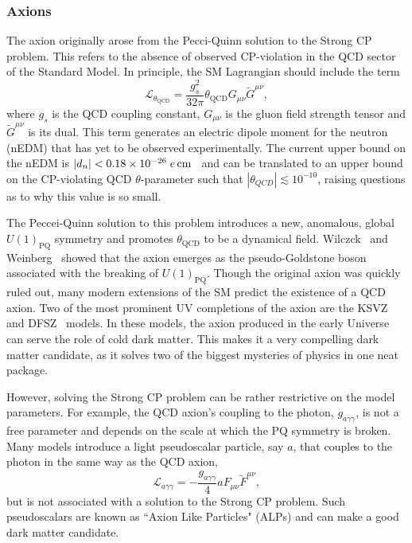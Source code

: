 \subsubsection{Axions}
The axion originally arose from the Pecci-Quinn solution to the Strong CP problem. This refers to the absence of observed CP-violation in the QCD sector of the Standard Model. In principle, the SM Lagrangian should include the term
\begin{equation}
    \mathcal{L}_{\theta_\mathrm{QCD}} = \frac{g_s^2}{32 \pi}\theta_\mathrm{QCD} G_{\mu\nu} \tilde{G}^{\mu\nu},
\end{equation}
where $g_s$ is the QCD coupling constant, $G_{\mu\nu}$ is the gluon field strength tensor and $\tilde{G}^{\mu\nu}$ is its dual. This term generates an electric dipole moment for the neutron (nEDM) that has yet to be observed experimentally. The current upper bound on the nEDM is $|d_n| < 0.18\times 10^{-26}\;e{\rm \,cm}$~\cite{Abel:2020pzs_feb_MeasurementPermanentElectric} and can be translated to an upper bound on the CP-violating QCD $\theta$-parameter such that $|\theta_{QCD}|\lesssim 10^{-10}$, raising questions as to why this value is so small. 

The Peccei-Quinn solution to this problem introduces a new, anomalous, global  $U(1)_{\mathrm{PQ}}$ symmetry and promotes $\theta_\mathrm{QCD}$ to be a dynamical field.
Wilczck~\cite{Wilczek:1977pj_ProblemStrongInvariance} and Weinberg~\cite{Weinberg:1977ma_NewLightBoson} showed that the axion emerges as the pseudo-Goldstone boson associated with the breaking of $U(1)_\mathrm{PQ}$. Though the original axion was quickly ruled out, many modern extensions of the SM predict the existence of a QCD axion. Two of the most prominent UV completions of the axion are the KSVZ~\cite{Kim:1979if_WeakInteractionSinglet, Shifman:1979if_CanConfinementEnsure} and DFSZ~\cite{Zhitnitsky_PossibleSuppressionAxion, Dine:1981rt_SimpleSolutionStrong} models. In these models, the axion produced in the early Universe can serve the role of cold dark matter. This makes it a very compelling dark matter candidate, as it solves two of the biggest mysteries of physics in one neat package. 

However, solving the Strong CP problem can be rather restrictive on the model parameters. For example, the QCD axion's coupling to the photon, $g_{a\gamma\gamma}$, is not a free parameter and depends on the scale at which the PQ symmetry is broken. Many models introduce a light pseudoscalar particle, say $a$, that couples to the photon in the same way as the QCD axion,  
\begin{equation}
    \mathcal{L}_{a\gamma\gamma} = -\frac{g_{a\gamma\gamma}}{4} a F_{\mu\nu}\tilde{F}^{\mu\nu},
\end{equation}
but is not associated with a solution to the Strong CP problem. Such pseudoscalars are known as ``Axion Like Particles" (ALPs) and can make a good dark matter candidate.

